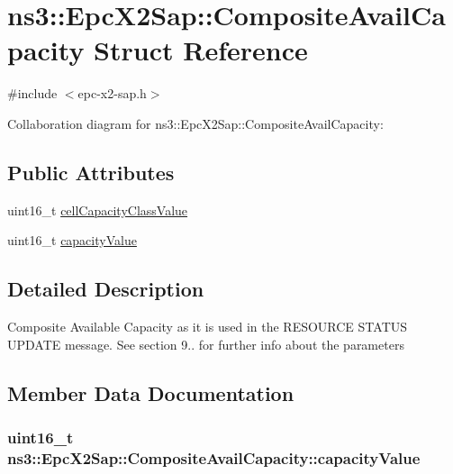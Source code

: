 \hypertarget{structns3_1_1EpcX2Sap_1_1CompositeAvailCapacity}{}\section{ns3\+:\+:Epc\+X2\+Sap\+:\+:Composite\+Avail\+Capacity Struct Reference}
\label{structns3_1_1EpcX2Sap_1_1CompositeAvailCapacity}


{\ttfamily \#include $<$epc-\/x2-\/sap.\+h$>$}



Collaboration diagram for ns3\+:\+:Epc\+X2\+Sap\+:\+:Composite\+Avail\+Capacity\+:
\subsection*{Public Attributes}
\begin{DoxyCompactItemize}
\item 
uint16\+\_\+t \hyperlink{structns3_1_1EpcX2Sap_1_1CompositeAvailCapacity_a5c7d063c912541effd7a3e0e8c6c14e8}{cell\+Capacity\+Class\+Value}
\item 
uint16\+\_\+t \hyperlink{structns3_1_1EpcX2Sap_1_1CompositeAvailCapacity_a815fe20773c1dd17ef8bdbe6a6334279}{capacity\+Value}
\end{DoxyCompactItemize}


\subsection{Detailed Description}
Composite Available Capacity as it is used in the R\+E\+S\+O\+U\+R\+CE S\+T\+A\+T\+US U\+P\+D\+A\+TE message. See section 9.. for further info about the parameters 

\subsection{Member Data Documentation}
\subsubsection[{\texorpdfstring{capacity\+Value}{capacityValue}}]{\setlength{\rightskip}{0pt plus 5cm}uint16\+\_\+t ns3\+::\+Epc\+X2\+Sap\+::\+Composite\+Avail\+Capacity\+::capacity\+Value}\hypertarget{structns3_1_1EpcX2Sap_1_1CompositeAvailCapacity_a815fe20773c1dd17ef8bdbe6a6334279}{}\label{structns3_1_1EpcX2Sap_1_1CompositeAvailCapacity_a815fe20773c1dd17ef8bdbe6a6334279}
